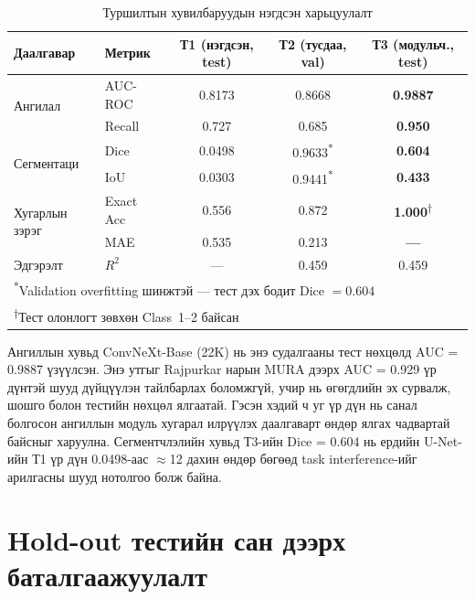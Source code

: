 \begin{table}[!htbp]
    \centering
    \small
    \begin{tabular}{l l c c c}
    \toprule
    \textbf{Даалгавар} & \textbf{Метрик}
        & \textbf{Т1 (нэгдсэн, test)}
        & \textbf{Т2 (тусдаа, val)}
        & \textbf{Т3 (модульч., test)} \\
    \midrule
    \multirow{2}{*}{Ангилал}
        & AUC-ROC  & 0.8173 & 0.8668 & \textbf{0.9887} \\
        & Recall   & 0.727  & 0.685  & \textbf{0.950} \\[4pt]
    \multirow{2}{*}{Сегментаци}
        & Dice     & 0.0498 & 0.9633\textsuperscript{*} & \textbf{0.604} \\
        & IoU      & 0.0303 & 0.9441\textsuperscript{*} & \textbf{0.433} \\[4pt]
    \multirow{2}{*}{Хугарлын зэрэг}
        & Exact Acc & 0.556 & 0.872 & \textbf{1.000}\textsuperscript{†} \\
        & MAE       & 0.535 & 0.213 & \textbf{---} \\[4pt]
    Эдгэрэлт & $R^2$   & ---   & 0.459 & 0.459 \\
    \bottomrule
    \multicolumn{5}{l}{\footnotesize\textsuperscript{*}Validation overfitting шинжтэй --- тест дэх бодит Dice $=0.604$} \\
    \multicolumn{5}{l}{\footnotesize\textsuperscript{†}Тест олонлогт зөвхөн Class~1--2 байсан}
    \end{tabular}
    \caption{Туршилтын хувилбаруудын нэгдсэн харьцуулалт}
    \label{tab:overall_compare}
\end{table}

Ангиллын хувьд ConvNeXt-Base (22K) нь энэ судалгааны тест нөхцөлд AUC = 0.9887 үзүүлсэн. Энэ утгыг Rajpurkar нарын MURA дээрх AUC = 0.929 үр дүнтэй шууд дүйцүүлэн тайлбарлах боломжгүй, учир нь өгөгдлийн эх сурвалж, шошго болон тестийн нөхцөл ялгаатай. Гэсэн хэдий ч уг үр дүн нь санал болгосон ангиллын модуль хугарал илрүүлэх даалгаварт өндөр ялгах чадвартай байсныг харуулна. Сегментчлэлийн хувьд Т3-ийн Dice = 0.604 нь ердийн U-Net-ийн Т1 үр дүн 0.0498-аас $\approx$12 дахин өндөр бөгөөд task interference-ийг арилгасны шууд нотолгоо болж байна.

\section{Hold-out тестийн сан дээрх баталгаажуулалт}
\label{sec:holdout_test}

